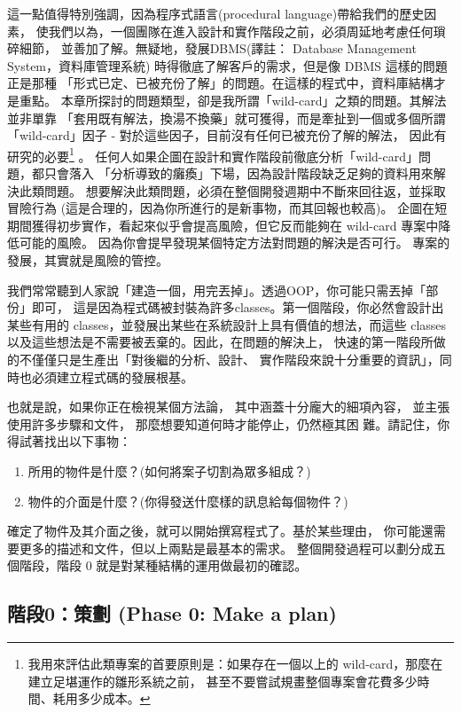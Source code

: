 這一點值得特別強調，因為程序式語言(procedural language)帶給我們的歷史因素，
使我們以為，一個團隊在進入設計和實作階段之前，必須周延地考慮任何瑣碎細節，
並善加了解。無疑地，發展DBMS(譯註： Database Management System，資料庫管理系統)
時得徹底了解客戶的需求，但是像 DBMS 這樣的問題正是那種
「形式已定、已被充份了解」的問題。在這樣的程式中，資料庫結構才是重點。
本章所探討的問題類型，卻是我所謂「wild-card」之類的問題。其解法並非單靠
「套用既有解法，換湯不換藥」就可獲得，而是牽扯到一個或多個所謂
「wild-card」因子 - 對於這些因子，目前沒有任何已被充份了解的解法，
因此有研究的必要\footnote{我用來評估此類專案的首要原則是：如果存在一個以上的
wild-card，那麼在建立足堪運作的雛形系統之前，
甚至不要嘗試規畫整個專案會花費多少時間、耗用多少成本。} 。
任何人如果企圖在設計和實作階段前徹底分析「wild-card」問題，都只會落入
「分析導致的癱瘓」下場，因為設計階段缺乏足夠的資料用來解決此類問題。
想要解決此類問題，必須在整個開發週期中不斷來回往返，並採取冒險行為
(這是合理的，因為你所進行的是新事物，而其回報也較高)。
企圖在短期間獲得初步實作，看起來似乎會提高風險，但它反而能夠在
wild-card 專案中降低可能的風險。
因為你會提早發現某個特定方法對問題的解決是否可行。
專案的發展，其實就是風險的管控。

我們常常聽到人家說「建造一個，用完丟掉」。透過OOP，你可能只需丟掉「部份」即可，
這是因為程式碼被封裝為許多classes。第一個階段，你必然會設計出某些有用的
classes，並發展出某些在系統設計上具有價值的想法，而這些
classes 以及這些想法是不需要被丟棄的。因此，在問題的解決上，
快速的第一階段所做的不僅僅只是生產出「對後繼的分析、設計、
實作階段來說十分重要的資訊」，同時也必須建立程式碼的發展根基。

也就是說，如果你正在檢視某個方法論，
其中涵蓋十分龐大的細項內容， 並主張使用許多步驟和文件，
那麼想要知道何時才能停止，仍然極其困
難。請記住，你得試著找出以下事物：
\begin{enumerate}
\item 所用的物件是什麼？(如何將案子切割為眾多組成？)
\item 物件的介面是什麼？(你得發送什麼樣的訊息給每個物件？)
\end{enumerate}
確定了物件及其介面之後，就可以開始撰寫程式了。基於某些理由，
你可能還需要更多的描述和文件，但以上兩點是最基本的需求。
整個開發過程可以劃分成五個階段，階段 0 就是對某種結構的運用做最初的確認。

\subsection{階段0：策劃 (Phase 0: Make a plan)}

